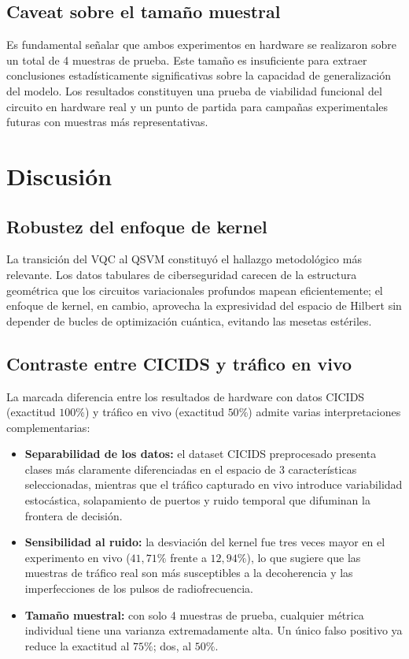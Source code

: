 \documentclass[10pt,conference]{IEEEtran}
\begin{document}
\subsection{Caveat sobre el tamaño muestral}
Es fundamental señalar que ambos experimentos en hardware se realizaron
sobre un total de 4 muestras de prueba. Este tamaño es insuficiente para
extraer conclusiones estadísticamente significativas sobre la capacidad
de generalización del modelo. Los resultados constituyen una prueba de
viabilidad funcional del circuito en hardware real y un punto de
partida para campañas experimentales futuras con muestras más
representativas.

\section{Discusión}

\subsection{Robustez del enfoque de kernel}
La transición del VQC al QSVM constituyó el hallazgo metodológico más
relevante. Los datos tabulares de ciberseguridad carecen de la
estructura geométrica que los circuitos variacionales profundos mapean
eficientemente; el enfoque de kernel, en cambio, aprovecha la
expresividad del espacio de Hilbert sin depender de bucles de
optimización cuántica, evitando las mesetas estériles.

\subsection{Contraste entre CICIDS y tráfico en vivo}
La marcada diferencia entre los resultados de hardware con datos CICIDS
(exactitud $100\%$) y tráfico en vivo (exactitud $50\%$) admite varias
interpretaciones complementarias:
\begin{itemize}
  \item \textbf{Separabilidad de los datos:} el dataset CICIDS
  preprocesado presenta clases más claramente diferenciadas en el
  espacio de 3 características seleccionadas, mientras que el tráfico
  capturado en vivo introduce variabilidad estocástica, solapamiento de
  puertos y ruido temporal que difuminan la frontera de decisión.
  \item \textbf{Sensibilidad al ruido:} la desviación del kernel fue
  tres veces mayor en el experimento en vivo ($41{,}71\%$ frente a
  $12{,}94\%$), lo que sugiere que las muestras de tráfico real son más
  susceptibles a la decoherencia y las imperfecciones de los pulsos de
  radiofrecuencia.
  \item \textbf{Tamaño muestral:} con solo 4 muestras de prueba,
  cualquier métrica individual tiene una varianza extremadamente alta.
  Un único falso positivo ya reduce la exactitud al $75\%$; dos, al
  $50\%$.
\end{itemize}
\end{document}
